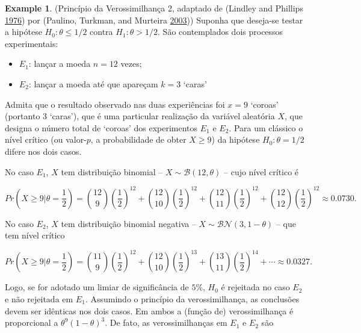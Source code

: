 \documentclass[
]{book}
\providecommand{\tightlist}{%
  \setlength{\itemsep}{0pt}\setlength{\parskip}{0pt}}
\theoremstyle{definition}
\theoremstyle{definition}
\newtheorem{example}{Example}[chapter]
\theoremstyle{definition}
\theoremstyle{remark}
\begin{document}
\begin{example}
\protect\hypertarget{exm:pv2}{}{\label{exm:pv2} }(Princípio da Verossimilhança 2, adaptado de (Lindley and Phillips \protect\hyperlink{ref-lindley1976inference}{1976}) por (Paulino, Turkman, and Murteira \protect\hyperlink{ref-paulino2003estatistica}{2003})) Suponha que deseja-se testar a hipótese \(H_0 : \theta \le 1/2\) contra \(H_1 : \theta > 1/2\). São contemplados dois processos experimentais:

\begin{itemize}
\tightlist
\item
  \(E_1\): lançar a moeda \(n=12\) vezes;\\
\item
  \(E_2\): lançar a moeda até que apareçam \(k=3\) `caras'
\end{itemize}

Admita que o resultado observado nas duas experiências foi \(x=9\) `coroas' (portanto 3 `caras'), que é uma particular realização da variável aleatória \(X\), que designa o número total de `coroas' dos experimentos \(E_1\) e \(E_2\). Para um clássico o nível crítico (ou valor-\(p\), a probabilidade de obter \(X \ge 9\)) da hipótese \(H_0 : \theta = 1/2\) difere nos dois casos.

No caso \(E_1\), \(X\) tem distribuição binomial -- \(X \sim \mathcal{B} \left( 12, \theta \right)\) -- cujo nível crítico é

\begin{equation}
Pr\left( X \geq 9 \bigg\rvert \theta = \dfrac{1}{2} \right) = \binom {12}{9}  \left(  \frac{1}{2} \right) ^{12} + \binom {12}{10} \left(  \frac{1}{2} \right) ^{12} + \binom {12}{11}  \left(  \frac{1}{2} \right) ^{12} + \binom {12}{12} \left( \frac{1}{2} \right) ^{12} \approx 0.0730. \nonumber
\label{eq:pvalue-binom}
\end{equation}

No caso \(E_2\), \(X\) tem distribuição binomial negativa -- \(X \sim \mathcal{BN} \left( 3, 1-\theta \right)\) -- que tem nível crítico

\begin{equation}
Pr\left( X \geq 9 \bigg\rvert \theta = \dfrac{1}{2} \right) = \binom {11}{9}  \left(  \frac{1}{2} \right) ^{12} + \binom {12}{10} \left(  \frac{1}{2} \right) ^{13} +\binom {13}{11}  \left(  \frac{1}{2} \right) ^{14} + \cdots \approx 0.0327. \nonumber
\label{eq:pvalue-nbinom}
\end{equation}

Logo, se for adotado um limiar de significância de \(5 \%\), \(H_0\) é rejeitada no caso \(E_2\) e não rejeitada em \(E_1\). Assumindo o princípio da verossimilhança, as conclusões devem ser idênticas nos dois casos. Em ambos a (função de) verossimilhança é proporcional a \(\theta^9 \left( 1 - \theta \right)^3\). De fato, as verossimilhanças em \(E_1\) e \(E_2\) são


\end{example}
\end{document}
